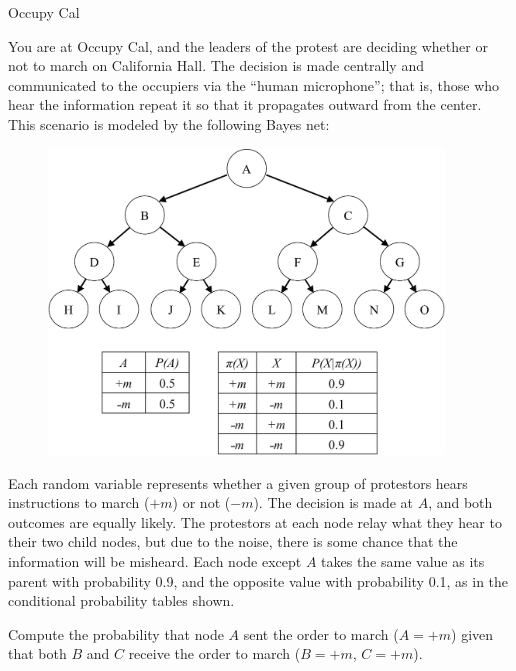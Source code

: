\begin{problem}[14]{Occupy Cal}

You are at Occupy Cal, and the leaders of the protest are deciding whether or not to march on California Hall. The decision is made centrally and communicated to the occupiers via the ``human microphone''; that is, those who hear the information repeat it so that it propagates outward from the center. This scenario is modeled by the following Bayes net:

\vspace{5mm}
\begin{figure}[htp]
\centering
\includegraphics[width=105mm]{figures/tree-labeled-tables-crop.pdf}
\end{figure}
\vspace{5mm}

Each random variable represents whether a given group of protestors hears instructions to march ($+m$) or not ($-m$). The decision is made at $A$, and both outcomes are equally likely. The protestors at each node relay what they hear to their two child nodes, but due to the noise, there is some chance that the information will be misheard. Each node except $A$ takes the same value as its parent with probability 0.9, and the opposite value with probability 0.1, as in the conditional probability tables shown.

\begin{question}[2] Compute the probability that node $A$ sent the order to march ($A = +m$) given that both $B$ and $C$ receive the order to march ($B=+m$, $C=+m$). \\
\end{question}


\end{problem}
